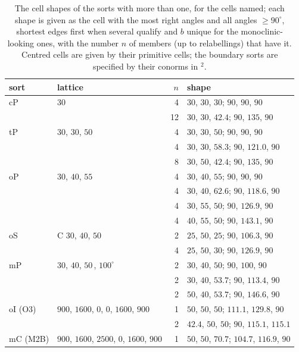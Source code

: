 \documentclass[preprint,pdf]{iucr}          %
\newcommand{\Ang}{\text{\AA}}
\begin{document}
\begin{table}
\caption{The cell shapes of the sorts with more than one, for the cells named; each shape is given as the cell with the most right angles and all angles $\ge90^\circ$, shortest edges first when several qualify and $b$ unique for the monoclinic-looking ones, with the number $n$ of members (up to relabellings) that have it. Centred cells are given by their primitive cells; the boundary sorts are specified by their conorms in \Ang$^2$.}
\label{tab:shapes}
\begin{footnotesize}
\begin{tabular}{llrl}
\toprule
sort & lattice & $n$ & shape \\
\midrule
cP & $30$\,\Ang & 4 & $30$, $30$, $30$; $90$, $90$, $90$ \\
   &            & 12 & $30$, $30$, $42.4$; $90$, $135$, $90$ \\
tP & $30$, $30$, $50$\,\Ang & 4 & $30$, $30$, $50$; $90$, $90$, $90$ \\
   &            & 4 & $30$, $30$, $58.3$; $90$, $121.0$, $90$ \\
   &            & 8 & $30$, $50$, $42.4$; $90$, $135$, $90$ \\
oP & $30$, $40$, $55$\,\Ang & 4 & $30$, $40$, $55$; $90$, $90$, $90$ \\
   &            & 4 & $30$, $40$, $62.6$; $90$, $118.6$, $90$ \\
   &            & 4 & $30$, $55$, $50$; $90$, $126.9$, $90$ \\
   &            & 4 & $40$, $55$, $50$; $90$, $143.1$, $90$ \\
oS & C $30$, $40$, $50$\,\Ang & 2 & $25$, $50$, $25$; $90$, $106.3$, $90$ \\
   &            & 4 & $25$, $50$, $30$; $90$, $126.9$, $90$ \\
mP & $30$, $40$, $50$\,\Ang, $100^\circ$ & 2 & $30$, $40$, $50$; $90$, $100$, $90$ \\
   &            & 2 & $30$, $40$, $53.7$; $90$, $113.4$, $90$ \\
   &            & 2 & $50$, $40$, $53.7$; $90$, $146.6$, $90$ \\
oI (O3) & $900$, $1600$, $0$, $0$, $1600$, $900$ & 1 & $50$, $50$, $50$; $111.1$, $129.8$, $90$ \\
   &            & 2 & $42.4$, $50$, $50$; $90$, $115.1$, $115.1$ \\
mC (M2B) & $900$, $1600$, $2500$, $0$, $1600$, $900$ & 1 & $50$, $50$, $70.7$; $104.7$, $116.9$, $90$ \\

\end{tabular}
\end{footnotesize}
\end{table}
\end{document}
